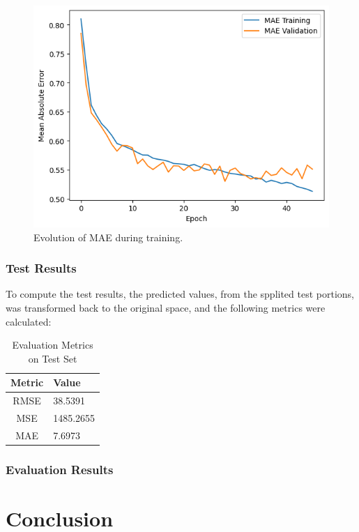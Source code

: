 \documentclass[sigconf,natbib=false]{acmart}
\begin{document}
\begin{figure}[h]
 \centering
 \includegraphics[width=\linewidth]{figs/mae_evolution.png}
 \caption{Evolution of MAE during training.}
\end{figure}

\subsubsection{Test Results}

To compute the test results, the predicted values, from the spplited test portions, was transformed back to the original space, and the following metrics were calculated:

\begin{table}
  \caption{Evaluation Metrics on Test Set}
  \label{tab:test_metrics}
  \begin{tabular}{cl}
    \toprule
    Metric & Value \\
    \midrule
    RMSE & 38.5391 \\
    MSE  & 1485.2655 \\
    MAE  & 7.6973 \\
    \bottomrule
  \end{tabular}
\end{table}

\subsubsection{Evaluation Results}

\section{Conclusion}
\end{document}
